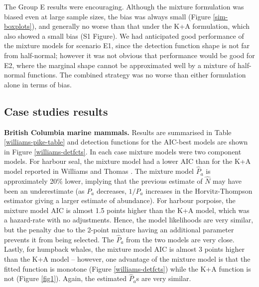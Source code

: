 \documentclass[10pt]{article}
\begin{document}
The Group E results were encouraging.  Although the mixture formulation was biased even at large sample sizes, the bias was always small (Figure \ref{sim-boxplots}), and generally no worse than that under the K+A formulation, which also showed a small bias (S1 Figure). We had anticipated good performance of the mixture models for scenario E1, since the detection function shape is not far from half-normal; however it was not obvious that performance would be good for E2, where the marginal shape cannot be approximated well by a mixture of half-normal functions.  The combined strategy was no worse than either formulation alone in terms of bias.  


\subsection*{Case studies results}

\textbf{British Columbia marine mammals.} Results are summarised in Table \ref{williams-pike-table} and detection functions for the AIC-best models are shown in Figure \ref{williams-detfcts}. In each case mixture models were two component models. For harbour seal, the mixture model had a lower AIC than for the K+A model reported in Williams and Thomas \cite{Williams:2007tc}. The mixture model $\hat{P}_a$ is approximately 20\% lower, implying that the previous estimate of $\hat{N}$ may have been an underestimate (as $P_a$ decreases, $1/P_a$ increases in the Horvitz-Thompson estimator giving a larger estimate of abundance). For harbour porpoise, the mixture model AIC is almost 1.5 points higher than the K+A model, which was a hazard-rate with no adjustments. Hence, the model likelihoods are very similar, but the penalty due to the 2-point mixture having an additional parameter prevents it from being selected.  The $\hat{P}_a$ from the two models are very close. Lastly, for humpback whales, the mixture model AIC is almost 3 points higher than the K+A model -- however, one advantage of the mixture model is that the fitted function is monotone (Figure \ref{williams-detfcts}) while the K+A function is not (Figure \ref{fig1}). Again, the estimated $\hat{P}_a$s are very similar.
\end{document}
